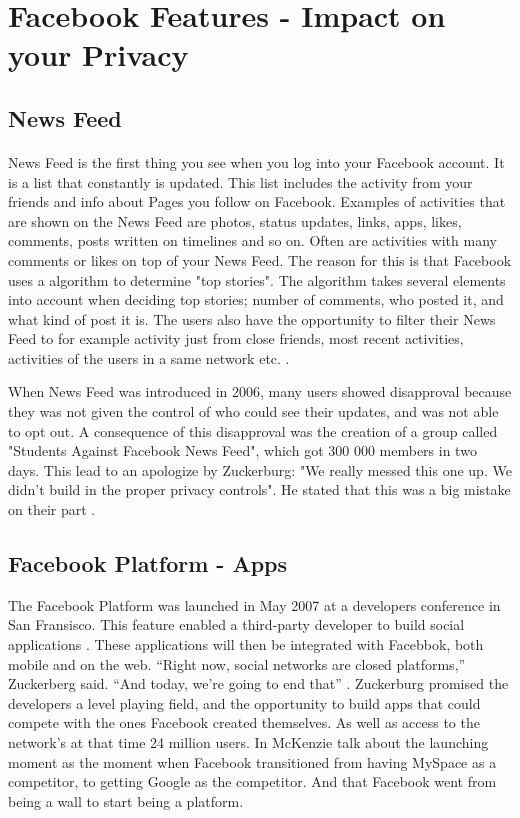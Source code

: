 \section{Facebook Features - Impact on your Privacy}\label{sec:facebook_features}

\subsection{News Feed}
\paragraph{}
News Feed is the first thing you see when you log into your Facebook account. It is a list that constantly is updated. This list includes the activity from your friends and info about Pages you follow on Facebook. Examples of activities that are shown on the News Feed are photos, status updates, links, apps, likes, comments, posts written on timelines and so on. Often are activities with many comments or likes on top of your News Feed. The reason for this is that Facebook uses a algorithm to determine "top stories". The algorithm takes several elements into account when deciding top stories; number of comments, who posted it, and what kind of post it is. The users also have the opportunity to filter their News Feed to for example activity just from close friends, most recent activities, activities of the users in a same network etc. \cite{newsfeed}.

When News Feed was introduced in 2006, many users showed disapproval because they was not given the control of who could see their updates, and was not able to opt out. A consequence of this disapproval was the creation of a group called "Students Against Facebook News Feed", which got 300 000 members in two days. This lead to an apologize by Zuckerburg: "We really messed this one up. We didn't build in the proper privacy controls". He stated that this was a big mistake on their part \cite{newsfeed2}. 


\subsection{Facebook Platform - Apps}
\label{subsec:app}
The Facebook Platform was launched in May 2007 at a developers conference in San Fransisco. This feature enabled a third-party developer to build social applications \cite{BBCFacebookGrowth}. These applications will then be integrated with Facebbok, both mobile and on the web. “Right now, social networks are closed platforms,” Zuckerberg said. “And today, we’re going to end that” \cite{platformStory}. Zuckerburg promised the developers a level playing field, and the opportunity to build apps that could compete with the ones Facebook created themselves. As well as access to the network's at that time 24 million users. In \cite{platformStory} McKenzie talk about the launching moment as the moment when Facebook transitioned from having MySpace as a competitor, to getting Google as the competitor. And that Facebook went from being a wall to start being a platform. 

